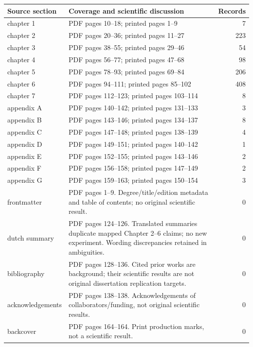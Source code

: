 \documentclass[11pt]{article}
\begin{document}
\begin{longtable}{p{90pt}p{225pt}r}
\toprule Source section & Coverage and scientific discussion & Records\\\midrule\endhead
chapter 1 & PDF pages 10--18; printed pages 1--9 & 7\\
chapter 2 & PDF pages 20--36; printed pages 11--27 & 223\\
chapter 3 & PDF pages 38--55; printed pages 29--46 & 54\\
chapter 4 & PDF pages 56--77; printed pages 47--68 & 98\\
chapter 5 & PDF pages 78--93; printed pages 69--84 & 206\\
chapter 6 & PDF pages 94--111; printed pages 85--102 & 408\\
chapter 7 & PDF pages 112--123; printed pages 103--114 & 8\\
appendix A & PDF pages 140--142; printed pages 131--133 & 3\\
appendix B & PDF pages 143--146; printed pages 134--137 & 8\\
appendix C & PDF pages 147--148; printed pages 138--139 & 4\\
appendix D & PDF pages 149--151; printed pages 140--142 & 1\\
appendix E & PDF pages 152--155; printed pages 143--146 & 2\\
appendix F & PDF pages 156--158; printed pages 147--149 & 2\\
appendix G & PDF pages 159--163; printed pages 150--154 & 3\\
frontmatter & PDF pages 1--9. Degree/title/edition metadata and table of contents; no original scientific result. & 0\\
dutch summary & PDF pages 124--126. Translated summaries duplicate mapped Chapter 2--6 claims; no new experiment. Wording discrepancies retained in ambiguities. & 0\\
bibliography & PDF pages 128--136. Cited prior works are background; their scientific results are not original dissertation replication targets. & 0\\
acknowledgements & PDF pages 138--138. Acknowledgements of collaborators/funding, not original scientific results. & 0\\
backcover & PDF pages 164--164. Print production marks, not a scientific result. & 0\\
\bottomrule\end{longtable}
\end{document}
